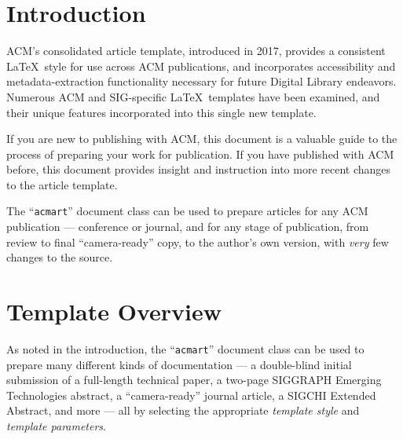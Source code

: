 \documentclass[manuscript,screen]{acmart}
\begin{document}



\maketitle

\setlength{\parskip}{-0.1pt}

\hypertarget{introduction}{%
\section{Introduction}\label{introduction}}

ACM's consolidated article template, introduced in 2017, provides a
consistent \LaTeX~style for use across ACM publications, and
incorporates accessibility and metadata-extraction functionality
necessary for future Digital Library endeavors. Numerous ACM and
SIG-specific \LaTeX~templates have been examined, and their unique
features incorporated into this single new template.

If you are new to publishing with ACM, this document is a valuable guide
to the process of preparing your work for publication. If you have
published with ACM before, this document provides insight and
instruction into more recent changes to the article template.

The ``\texttt{acmart}'' document class can be used to prepare articles
for any ACM publication --- conference or journal, and for any stage of
publication, from review to final ``camera-ready'' copy, to the author's
own version, with \emph{very} few changes to the source.

\hypertarget{template-overview}{%
\section{Template Overview}\label{template-overview}}

As noted in the introduction, the ``\texttt{acmart}'' document class can
be used to prepare many different kinds of documentation --- a
double-blind initial submission of a full-length technical paper, a
two-page SIGGRAPH Emerging Technologies abstract, a ``camera-ready''
journal article, a SIGCHI Extended Abstract, and more --- all by
selecting the appropriate \emph{template style} and \emph{template
parameters}.
\end{document}
